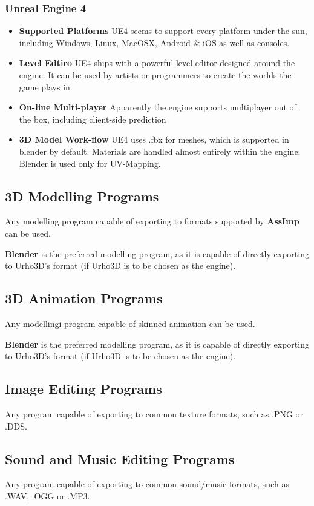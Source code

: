 \subsubsection*{Unreal Engine 4}
\begin{itemize}
    \item \textbf{Supported Platforms}
        UE4 seems to support every platform under the sun, including Windows, Linux, MacOSX, Android & iOS as well as consoles. 
    \item \textbf{Level Edtiro}
        UE4 ships with a powerful level  editor  designed  around  the engine. It can be
        used  by  artists  or  programmers  to  create  the  worlds the game  plays  in.
    \item \textbf{On-line Multi-player}
        Apparently the engine supports multiplayer out of the box, including client-side prediction
    \item \textbf{3D Model Work-flow}
        UE4 uses .fbx for meshes, which is supported in blender by default. Materials are handled almost entirely within the engine;
        Blender is used only for UV-Mapping.
\end{itemize}


\subsection{3D Modelling Programs}

Any   modelling   program   capable   of   exporting  to  formats  supported  by
\textbf{AssImp} can be used.

\textbf{Blender}  is  the  preferred  modelling  program, as it  is  capable  of
directly exporting to Urho3D's format (if Urho3D is to be chosen as the engine).


\subsection{3D Animation Programs}

Any modellingi program capable of skinned animation can be used.

\textbf{Blender}  is  the  preferred  modelling  program,  as  it  is capable of
directly exporting to Urho3D's format (if Urho3D is to be chosen as the engine).


\subsection{Image Editing Programs}

Any program capable of exporting to common texture formats, such as .PNG or .DDS.


\subsection{Sound and Music Editing Programs}

Any program capable of exporting to common sound/music formats, such as .WAV, .OGG or .MP3.

